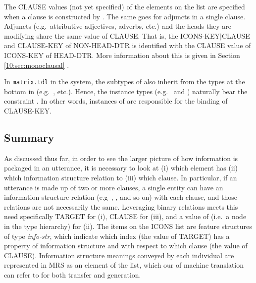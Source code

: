 
\noindent The CLAUSE values (not yet specified) of the elements on the
 list are specified when a clause is constructed by
. The same goes for adjuncts in a
single clause.  Adjuncts (e.g.\ attributive adjectives, adverbs, etc.)
and the heads they are modifying share the same value of
CLAUSE. That is, the ICONS-KEY{$\mid$}CLAUSE
and CLAUSE-KEY of NON-HEAD-DTR is identified with the CLAUSE value of
ICONS-KEY of HEAD-DTR. More information about this is given in
Section \ref{10:sec:monoclausal}
.





In \texttt{matrix.tdl} in the \lingo {} system, the
subtypes of  also inherit from the types at the
bottom in  (e.g.\ ,
etc.). Hence, the instance types (e.g.\ 
and ) naturally bear the constraint
. In other words, instances of
 are responsible for the binding of CLAUSE-KEY.




\subsection{Summary}
\label{9:ssec:icons-summary}

As discussed thus far, in order to see the larger picture of how
information is packaged in an utterance, it is necessary to look at
(i) which element has (ii) which information structure relation to
(iii) which clause. In particular, if an utterance is made up of two
or more clauses, a single entity can have an information structure
relation (e.g\ , , and so on) with each clause, and those
relations are not necessarily the
same. Leveraging binary
relations meets this need specifically TARGET for (i), CLAUSE for
(iii), and a value of  (i.e.\ a
node in the type hierarchy) for (ii). The items on the ICONS list are
feature structures of type \textit{info-str}, which indicate which
index (the value of TARGET) has a property of information structure
and with respect to which clause (the value of CLAUSE).  Information
structure meanings conveyed by each individual are represented in MRS
as an element of the  list, which our
 of machine translation can refer to for both
transfer and generation.




